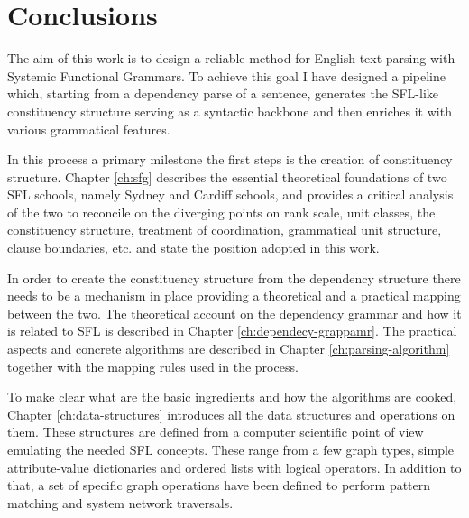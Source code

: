 \chapter{Conclusions}
\label{ch:conclusions}




The aim of this work is to design a reliable method for English text parsing with Systemic Functional Grammars. To achieve this goal I have designed a pipeline which, starting from a dependency parse of a sentence, generates the SFL-like constituency structure serving as a syntactic backbone and then enriches it with various grammatical features. 

In this process a primary milestone the first steps is the creation of constituency structure. Chapter \ref{ch:sfg} describes the essential theoretical foundations of two SFL schools, namely Sydney and Cardiff schools, and provides a critical analysis of the two to reconcile on the diverging points on rank scale, unit classes, the constituency structure, treatment of coordination, grammatical unit structure, clause boundaries, etc. and state the position adopted in this work. 

In order to create the constituency structure from the dependency structure there needs to be a mechanism in place providing a theoretical and a practical mapping between the two. The theoretical account on the dependency grammar and how it is related to SFL is described in Chapter \ref{ch:dependecy-grappamr}. The practical aspects and concrete algorithms are described in Chapter \ref{ch:parsing-algorithm} together with the mapping rules used in the process. 

To make clear what are the basic ingredients and how the algorithms are cooked, Chapter \ref{ch:data-structures} introduces all the data structures and operations on them. These structures are defined from a computer scientific point of view emulating the needed SFL concepts. These range from a few graph types, simple attribute-value dictionaries and ordered lists with logical operators. In addition to that, a set of specific graph operations have been defined to perform pattern matching and system network traversals.


